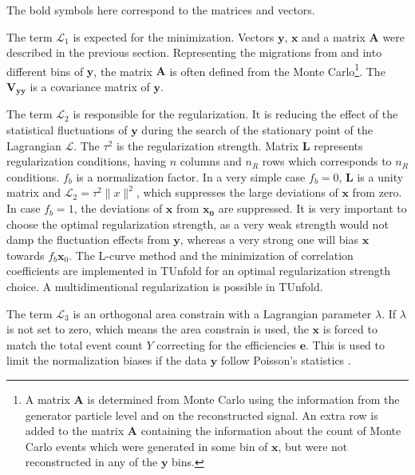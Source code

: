 The bold symbols here correspond to the matrices and vectors.

The term $\mathcal{L}_{1}$ is expected for the minimization. Vectors $\mathbf{y}$, $\mathbf{x}$ and a matrix $\mathbf{A}$ were
described in the previous section. Representing the migrations from and into different bins of $\mathbf{y}$, the matrix $\mathbf{A}$
is often defined from the Monte Carlo\footnote{A matrix $\mathbf{A}$ is
determined from Monte Carlo using the information from the generator particle level and on the reconstructed signal. An extra row is added
to the matrix $\mathbf{A}$ containing the information about the count of Monte Carlo events which were generated in some bin of $\mathbf{x}$,
but were not reconstructed in any of the $\mathbf{y}$ bins.}.
The $\mathbf{V_{yy}}$ is a covariance matrix of $\mathbf{y}$. 

The term $\mathcal{L}_{2}$ is responsible for the regularization. It is reducing the effect of the statistical fluctuations of $\mathbf{y}$
during the search of the stationary point of the Lagrangian $\mathcal{L}$. The $\tau^{2}$ is the regularization strength. Matrix $\mathbf{L}$
represents regularization conditions, having $n$ columns and $n_{R}$ rows which corresponds to $n_{R}$ conditions. $f_{b}$ is a normalization 
factor. In a very simple case $f_{b} = 0$, $\mathbf{L}$ is a unity matrix and $\mathcal{L}_{2} = \tau^{2} \parallel x \parallel^{2}$, which
suppresses the large deviations of $\mathbf{x}$ from zero. In case $f_{b} = 1$, the deviations of $\mathbf{x}$ from $\mathbf{x_{0}}$ are
suppressed. It is very important to choose the optimal regularization strength, as a very weak strength would not damp the fluctuation effects
from $\mathbf{y}$, whereas a very strong one will bias $\mathbf{x}$ towards $f_{b}\mathbf{x}_{0}$. The L-curve method \cite{Hansen00thel-curve} and the minimization
of correlation coefficients \cite{VBlobelT} are implemented in TUnfold for an optimal regularization strength choice. A multidimentional
regularization is possible in TUnfold.

The term $\mathcal{L}_{3}$ is an orthogonal area constrain with a Lagrangian parameter $\lambda$. If $\lambda$ is not set to zero,
which means the area constrain is used, the $\mathbf{x}$ is forced to match the total event count $Y$ correcting for the efficiencies $\mathbf{e}$.
This is used to limit the normalization biases if the data $\mathbf{y}$ follow Poisson's statistics \cite{Cowan98}.

